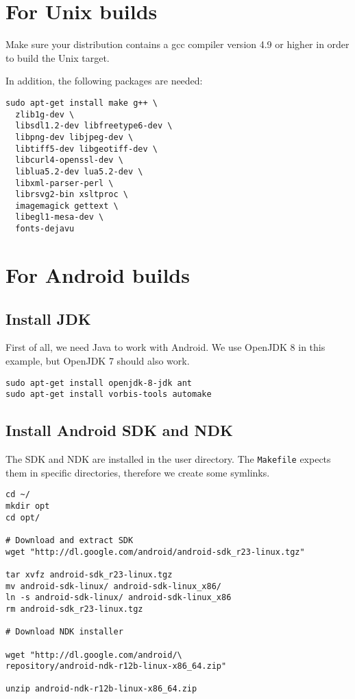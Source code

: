 \section{For Unix builds}

Make sure your distribution contains a gcc compiler version 4.9 or higher in order to build the Unix target.

In addition, the following packages are needed:

\begin{verbatim}
sudo apt-get install make g++ \
  zlib1g-dev \
  libsdl1.2-dev libfreetype6-dev \
  libpng-dev libjpeg-dev \
  libtiff5-dev libgeotiff-dev \
  libcurl4-openssl-dev \
  liblua5.2-dev lua5.2-dev \
  libxml-parser-perl \
  librsvg2-bin xsltproc \
  imagemagick gettext \
  libegl1-mesa-dev \
  fonts-dejavu
\end{verbatim}

\section{For Android  builds}
\subsection{Install JDK}
First of all, we need Java to work with Android. We use OpenJDK 8 in this example, but OpenJDK 7 should also work.

\begin{verbatim}
sudo apt-get install openjdk-8-jdk ant
sudo apt-get install vorbis-tools automake
\end{verbatim}

\subsection{Install Android SDK and NDK}

The SDK and NDK are installed in the user directory. The \texttt{Makefile} expects them in specific directories, therefore we create some symlinks.

\begin{verbatim}
cd ~/
mkdir opt
cd opt/

# Download and extract SDK
wget "http://dl.google.com/android/android-sdk_r23-linux.tgz"

tar xvfz android-sdk_r23-linux.tgz
mv android-sdk-linux/ android-sdk-linux_x86/
ln -s android-sdk-linux/ android-sdk-linux_x86
rm android-sdk_r23-linux.tgz

# Download NDK installer

wget "http://dl.google.com/android/\
repository/android-ndk-r12b-linux-x86_64.zip"

unzip android-ndk-r12b-linux-x86_64.zip
\end{verbatim}

